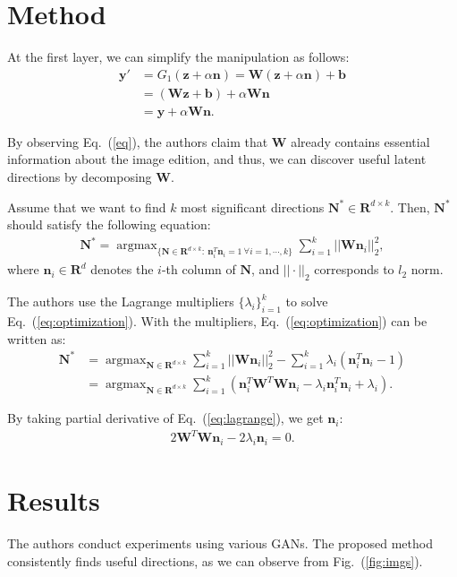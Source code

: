 \documentclass[10pt,twocolumn,letterpaper]{article}
\newcommand{\N}{{\mathbf{N}}}
\newcommand{\R}{{\mathbf{R}}}
\newcommand{\A}{{\mathbf{W}}}
\newcommand{\n}{{\mathbf{n}}}
\newcommand{\argmax}{\mathop{\arg\max}}  %
\begin{document}
\section{Method}
At the first layer, we can simplify the manipulation as follows:
\begin{align}
    \mathbf{y}' &= G_1(\mathbf{z} + \alpha\mathbf{n}) = \mathbf{W}(\mathbf{z} + \alpha\mathbf{n}) + \mathbf{b}\nonumber\\
    &= (\mathbf{W}\mathbf{z} + \mathbf{b}) + \alpha\mathbf{W}\mathbf{n}\nonumber\\
    &= \mathbf{y} + \alpha\mathbf{W}\mathbf{n}.\label{eq}
\end{align}

By observing Eq.~(\ref{eq}), the authors claim that $\mathbf{W}$ already contains essential information about the image edition, and thus, we can discover useful latent directions by decomposing $\mathbf{W}$.

Assume that we want to find $k$ most significant directions $\N^{*} \in \mathbf{R}^{d \times k}$. Then, $\N^{*}$ should satisfy the following equation:
\begin{align}
    \N^* = \argmax_{\{\N\in\R^{d\times k}:\ \n_i^T\n_i = 1\ \forall i=1,\cdots,k\}} \sum_{i=1}^k ||\A\n_i||_2^2,  \label{eq:optimization}
\end{align}
where $\n_i \in \mathbf{R}^d$ denotes the $i$-th column of $\N$, and $||\cdot||_2$ corresponds to $l_2$ norm.

The authors use the Lagrange multipliers $\{\lambda_i\}_{i=1}^k$ to solve Eq.~(\ref{eq:optimization}). With the multipliers, Eq.~(\ref{eq:optimization}) can be written as:
\begin{align}
    \N^* &= \argmax_{\N\in\R^{d\times k}} \sum_{i=1}^k ||\A\n_i||_2^2 - \sum_{i=1}^k\lambda_i(\n_i^T\n_i - 1) \nonumber \\
    &= \argmax_{\N\in\R^{d\times k}} \sum_{i=1}^k (\n_i^T\A^T\A\n_i - \lambda_i\n_i^T\n_i + \lambda_i). \label{eq:lagrange}
\end{align}

By taking partial derivative of Eq.~(\ref{eq:lagrange}), we get $\n_i$:
\begin{align}
    2\A^T\A\n_i - 2\lambda_i\n_i = 0. \label{eq:solution}
\end{align} 

\section{Results}
The authors conduct experiments using various GANs. The proposed method consistently finds useful directions, as we can observe from Fig.~(\ref{fig:imgs}). 
\end{document}
